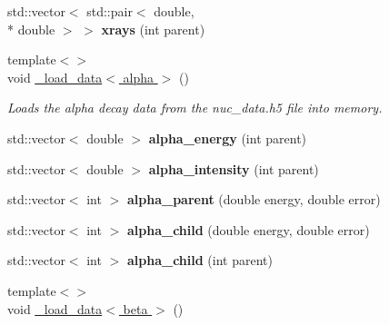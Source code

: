 \begin{DoxyCompactItemize}
\item 
\hypertarget{namespacepyne_a086ed3576eb51bbdc721fbd5754ecf30}{std\-::vector$<$ std\-::pair$<$ double, \\*
double $>$ $>$ {\bfseries xrays} (int parent)}\label{namespacepyne_a086ed3576eb51bbdc721fbd5754ecf30}

\item 
\hypertarget{namespacepyne_a673b0b45ebe0592568a4562122a18bbb}{{\footnotesize template$<$$>$ }\\void \hyperlink{namespacepyne_a673b0b45ebe0592568a4562122a18bbb}{\-\_\-load\-\_\-data$<$ alpha $>$} ()}\label{namespacepyne_a673b0b45ebe0592568a4562122a18bbb}

\begin{DoxyCompactList}\small\item\em Loads the alpha decay data from the nuc\-\_\-data.\-h5 file into memory. \end{DoxyCompactList}\item 
\hypertarget{namespacepyne_a99b2ffce326da5691c5a9845160e2941}{std\-::vector$<$ double $>$ {\bfseries alpha\-\_\-energy} (int parent)}\label{namespacepyne_a99b2ffce326da5691c5a9845160e2941}

\item 
\hypertarget{namespacepyne_a9060c732198093622687083cce03f9a8}{std\-::vector$<$ double $>$ {\bfseries alpha\-\_\-intensity} (int parent)}\label{namespacepyne_a9060c732198093622687083cce03f9a8}

\item 
\hypertarget{namespacepyne_a349b73b8c365292fc2b91d1e4fc64154}{std\-::vector$<$ int $>$ {\bfseries alpha\-\_\-parent} (double energy, double error)}\label{namespacepyne_a349b73b8c365292fc2b91d1e4fc64154}

\item 
\hypertarget{namespacepyne_ad610784cfca1a49090a15daf49fe21c4}{std\-::vector$<$ int $>$ {\bfseries alpha\-\_\-child} (double energy, double error)}\label{namespacepyne_ad610784cfca1a49090a15daf49fe21c4}

\item 
\hypertarget{namespacepyne_a80cd5a9276515010515462d27f500fbc}{std\-::vector$<$ int $>$ {\bfseries alpha\-\_\-child} (int parent)}\label{namespacepyne_a80cd5a9276515010515462d27f500fbc}

\item 
\hypertarget{namespacepyne_ac03b565590e9d917e4f93d65dac36db6}{{\footnotesize template$<$$>$ }\\void \hyperlink{namespacepyne_ac03b565590e9d917e4f93d65dac36db6}{\-\_\-load\-\_\-data$<$ beta $>$} ()}\label{namespacepyne_ac03b565590e9d917e4f93d65dac36db6}


\end{DoxyCompactItemize}
